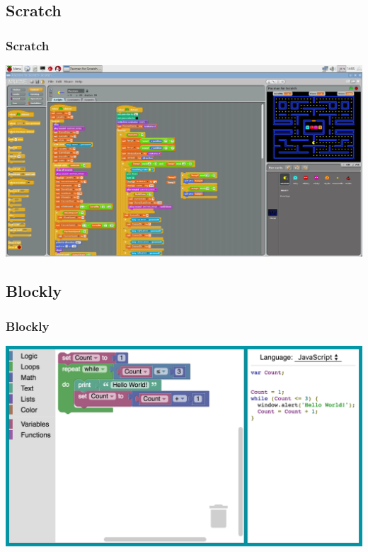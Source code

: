 \documentclass{beamer}
\begin{document}
\subsection{Scratch}
\begin{frame}
\frametitle{Scratch}
\vspace{-0.5cm}
\begin{center}
\includegraphics[scale=0.19]{images/scratch.png}
\end{center}
\end{frame}


\subsection{Blockly}
\begin{frame}
\frametitle{Blockly}
\begin{center}
\includegraphics[scale=0.21]{images/blockly.png}
\end{center}
\end{frame}
\end{document}
